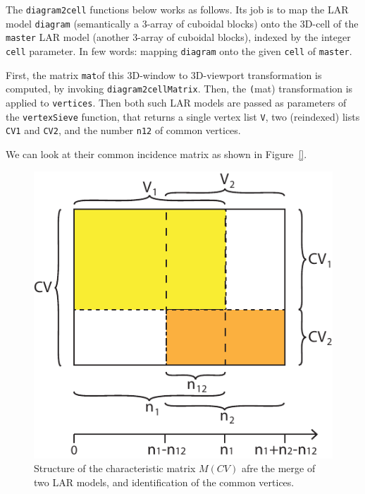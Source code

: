 \documentclass[11pt,oneside]{article}	%
\begin{document}
The \texttt{diagram2cell} functions below works as follows.  Its job is to map the LAR model \texttt{diagram} (semantically a 3-array of cuboidal blocks) onto the 3D-cell of the \texttt{master} LAR model (another 3-array of cuboidal blocks), indexed by the integer \texttt{cell} parameter. In few words: mapping \texttt{diagram} onto the given \texttt{cell} of \texttt{master}.

First, the matrix \texttt{mat}of this 3D-window to 3D-viewport transformation is computed, by invoking \texttt{diagram2cellMatrix}. Then, the \texttt(mat) transformation is applied to \texttt{vertices}.
Then both such LAR models are passed as parameters of the \texttt{vertexSieve} function, that returns a single vertex list \texttt{V}, two (reindexed) lists \texttt{CV1} and \texttt{CV2}, and the number \texttt{n12} of common vertices.


We can look at their common incidence matrix as shown in Figure~\ref{}.

\begin{figure}[htbp] %
   \centering
   \includegraphics[width=0.4\linewidth]{images/merge} 
   \caption{Structure of the characteristic matrix $M(CV)$ afre the merge of two LAR models, and identification of the common vertices.}
   \label{fig:example}
\end{figure}
\end{document}
